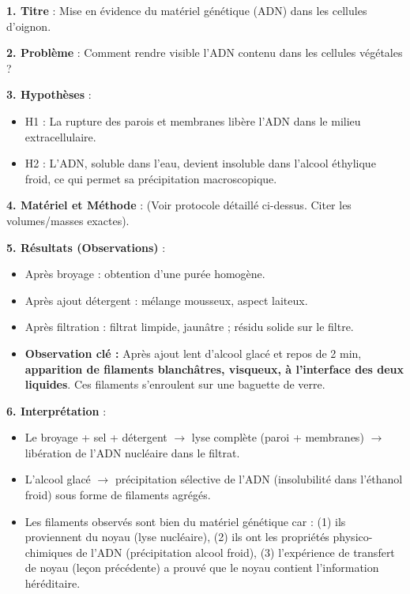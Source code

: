 \documentclass[11pt]{article}
\begin{document}
\begin{exoresolu}
\textbf{1. Titre} : Mise en évidence du matériel génétique (ADN) dans les cellules d'oignon.

\textbf{2. Problème} : Comment rendre visible l'ADN contenu dans les cellules végétales ?

\textbf{3. Hypothèses} :
\begin{itemize}
    \item H1 : La rupture des parois et membranes libère l'ADN dans le milieu extracellulaire.
    \item H2 : L'ADN, soluble dans l'eau, devient insoluble dans l'alcool éthylique froid, ce qui permet sa précipitation macroscopique.
\end{itemize}

\textbf{4. Matériel et Méthode} : (Voir protocole détaillé ci-dessus. Citer les volumes/masses exactes).

\textbf{5. Résultats (Observations)} :
\begin{itemize}
    \item Après broyage : obtention d'une purée homogène.
    \item Après ajout détergent : mélange mousseux, aspect laiteux.
    \item Après filtration : filtrat limpide, jaunâtre ; résidu solide sur le filtre.
    \item \textbf{Observation clé :} Après ajout lent d'alcool glacé et repos de 2 min, \textbf{apparition de filaments blanchâtres, visqueux, à l'interface des deux liquides}. Ces filaments s'enroulent sur une baguette de verre.
\end{itemize}

\textbf{6. Interprétation} :
\begin{itemize}
    \item Le broyage + sel + détergent $\rightarrow$ lyse complète (paroi + membranes) $\rightarrow$ libération de l'ADN nucléaire dans le filtrat.
    \item L'alcool glacé $\rightarrow$ précipitation sélective de l'ADN (insolubilité dans l'éthanol froid) sous forme de filaments agrégés.
    \item Les filaments observés sont bien du matériel génétique car : (1) ils proviennent du noyau (lyse nucléaire), (2) ils ont les propriétés physico-chimiques de l'ADN (précipitation alcool froid), (3) l'expérience de transfert de noyau (leçon précédente) a prouvé que le noyau contient l'information héréditaire.
\end{itemize}


\end{exoresolu}
\end{document}
